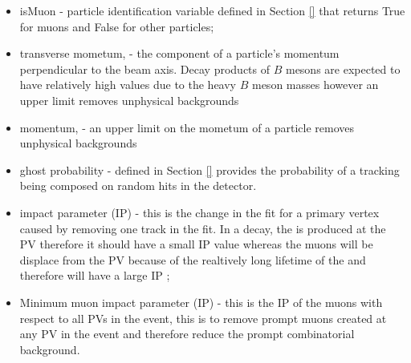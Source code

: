 \begin{itemize}
\item isMuon - particle identification variable defined in Section \ref{} that returns True for muons and False for other particles;
\item transverse mometum, \pt - the component of a particle's momentum perpendicular to the beam axis. Decay products of $B$ mesons are expected to have relatively high \pt values due to the heavy $B$ meson masses however an upper limit removes unphysical backgrounds
\item momentum, \p - an upper limit on the mometum of a particle  removes unphysical backgrounds
\item ghost probability - defined in Section \ref{} provides the probability of a tracking being composed on random hits in the detector.
\item impact parameter (IP) \chisqd - this is the change in the fit for a primary vertex caused by removing one track in the fit. In a \bsmumu decay, the \bs is produced at the PV therefore it should have a small IP \chisqd value whereas the muons will be displace from the PV because of the realtively long lifetime of the \bs and therefore will have a large IP \chisqd;
\item Minimum muon impact parameter (IP) \chisqd - this is the IP \chisqd of the muons with respect to all PVs in the event, this is to remove prompt muons created at any PV in the event and therefore reduce the prompt combinatorial background. 


\end{itemize}
